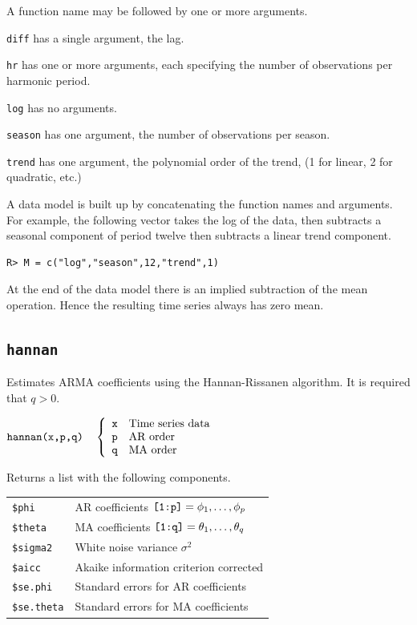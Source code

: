 \documentclass[12pt]{article}
\begin{document}
\noindent
A function name may be followed by one or more arguments.

\medskip
\noindent
{\tt diff} has a single argument, the lag.

\medskip
\noindent
{\tt hr} has one or more arguments, each specifying the number
of observations per harmonic period.

\medskip
\noindent
{\tt log} has no arguments.

\medskip
\noindent
{\tt season} has one argument, the number of observations per season.

\medskip
\noindent
{\tt trend} has one argument, the polynomial order of the trend,
(1 for linear, 2 for quadratic, etc.)

\bigskip
\noindent
A data model is built up by concatenating the function
names and arguments. For example, the following vector takes the
log of the data, then subtracts a seasonal component of period twelve
then subtracts a linear trend component.

\begin{verbatim}
R> M = c("log","season",12,"trend",1)
\end{verbatim}

\noindent
At the end of the data model there is an implied subtraction
of the mean operation.
Hence the resulting time series always has zero mean.

\newpage

\subsection{\tt hannan}
Estimates ARMA coefficients using the Hannan-Rissanen algorithm.
It is required that $q>0$.

\bigskip
$
\hbox{\tt hannan(x,p,q)}\quad\left\{\begin{array}{ll}
{\tt x} & \hbox{Time series data}\\
{\tt p} & \hbox{AR order}\\
{\tt q} & \hbox{MA order}
\end{array}\right.
$

\bigskip
\noindent
Returns a list with the following components.

\begin{center}
\begin{tabular}{ll}
{\tt \$phi} & AR coefficients $\hbox{\tt[1:p]}=\phi_1,\ldots,\phi_p$\\
{\tt \$theta} & MA coefficients $\hbox{\tt[1:q]}=\theta_1,\ldots,\theta_q$\\
{\tt \$sigma2} & White noise variance $\sigma^2$\\
{\tt \$aicc} & Akaike information criterion corrected\\
{\tt \$se.phi} & Standard errors for AR coefficients\\
{\tt \$se.theta} & Standard errors for MA coefficients
\end{tabular}
\end{center}
\end{document}
